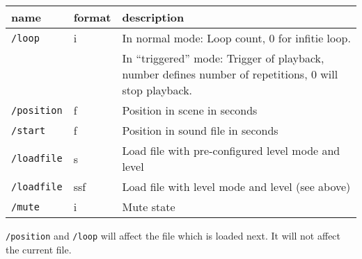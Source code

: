 \begin{tabularx}{\textwidth}{llX}
\hline
name            & format & description                                                                                             \\
\hline
{\tt /loop}     & i      & In normal mode: Loop count, 0 for infitie loop.                                                         \\
                &        & In ``triggered'' mode: Trigger of playback, number defines number of repetitions, 0 will stop playback. \\
{\tt /position} & f      & Position in scene in seconds                                                                            \\
{\tt /start}    & f      & Position in sound file in seconds                                                                       \\
{\tt /loadfile} & s      & Load file with pre-configured level mode and level                                                      \\
{\tt /loadfile} & ssf    & Load file with level mode and level (see above)                                                         \\
{\tt /mute}     & i      & Mute state                                                                                              \\
\hline
\end{tabularx}




\verb!/position! and \verb!/loop! will affect the file which is loaded next. It will not affect the current file.
